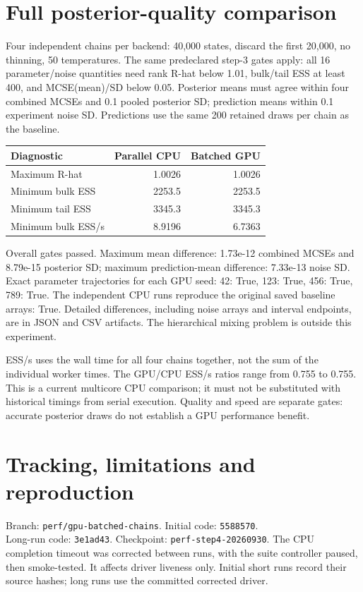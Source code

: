 \documentclass[11pt]{article}
\begin{document}
\section*{Full posterior-quality comparison}
Four independent chains per backend: 40,000 states, discard the first 20,000,
no thinning, 50 temperatures. The same predeclared step-3 gates apply: all 16
parameter/noise quantities need rank R-hat below 1.01, bulk/tail ESS at least 400,
and MCSE(mean)/SD below 0.05. Posterior means must agree within four combined
MCSEs and 0.1 pooled posterior SD; prediction means within 0.1 experiment noise
SD. Predictions use the same 200 retained draws per chain as the baseline.
\begin{center}\begin{tabular}{lrr}\toprule
Diagnostic & Parallel CPU & Batched GPU\\\midrule
Maximum R-hat & 1.0026 & 1.0026\\
Minimum bulk ESS & 2253.5 & 2253.5\\
Minimum tail ESS & 3345.3 & 3345.3\\
Minimum bulk ESS/s & 8.9196 & 6.7363\\
\bottomrule\end{tabular}\end{center}
Overall gates passed. Maximum mean difference: 1.73e-12 combined MCSEs and
8.79e-15 posterior SD; maximum prediction-mean difference: 7.33e-13 noise SD.
Exact parameter trajectories for each GPU seed: 42: True, 123: True, 456: True, 789: True.
The independent CPU runs reproduce the original saved baseline arrays: True.
Detailed differences, including noise arrays and interval endpoints, are in JSON
and CSV artifacts. The hierarchical mixing problem is outside this experiment.

ESS/s uses the wall time for all four chains together, not the sum of the
individual worker times. The GPU/CPU ESS/s ratios range from 0.755 to 0.755.
This is a current multicore CPU comparison; it must not be substituted with
historical timings from serial execution. Quality and speed are separate gates:
accurate posterior draws do not establish a GPU performance benefit.
\section*{Tracking, limitations and reproduction}
Branch: \texttt{perf/gpu-batched-chains}. Initial code: \texttt{5588570}.\\
Long-run code: \texttt{3e1ad43}. Checkpoint: \texttt{perf-step4-20260930}.
The CPU completion timeout was corrected between runs, with the suite controller
paused, then smoke-tested. It affects driver liveness only. Initial short runs
record their source hashes; long runs use the committed corrected driver.
\end{document}

